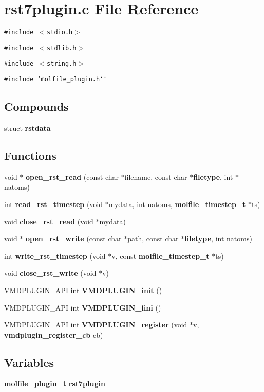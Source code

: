 \section{rst7plugin.c File Reference}
\label{rst7plugin_8c}
{\tt \#include $<$stdio.h$>$}\par
{\tt \#include $<$stdlib.h$>$}\par
{\tt \#include $<$string.h$>$}\par
{\tt \#include \char`\"{}molfile\_\-plugin.h\char`\"{}}\par
\subsection*{Compounds}
\begin{CompactItemize}
\item 
struct {\bf rstdata}
\end{CompactItemize}
\subsection*{Functions}
\begin{CompactItemize}
\item 
void $\ast$ {\bf open\_\-rst\_\-read} (const char $\ast$filename, const char $\ast${\bf filetype}, int $\ast$natoms)
\item 
int {\bf read\_\-rst\_\-timestep} (void $\ast$mydata, int natoms, {\bf molfile\_\-timestep\_\-t} $\ast$ts)
\item 
void {\bf close\_\-rst\_\-read} (void $\ast$mydata)
\item 
void $\ast$ {\bf open\_\-rst\_\-write} (const char $\ast$path, const char $\ast${\bf filetype}, int natoms)
\item 
int {\bf write\_\-rst\_\-timestep} (void $\ast$v, const {\bf molfile\_\-timestep\_\-t} $\ast$ts)
\item 
void {\bf close\_\-rst\_\-write} (void $\ast$v)
\item 
VMDPLUGIN\_\-API int {\bf VMDPLUGIN\_\-init} ()
\item 
VMDPLUGIN\_\-API int {\bf VMDPLUGIN\_\-fini} ()
\item 
VMDPLUGIN\_\-API int {\bf VMDPLUGIN\_\-register} (void $\ast$v, {\bf vmdplugin\_\-register\_\-cb} cb)
\end{CompactItemize}
\subsection*{Variables}
\begin{CompactItemize}
\item 
{\bf molfile\_\-plugin\_\-t} {\bf rst7plugin}
\end{CompactItemize}


